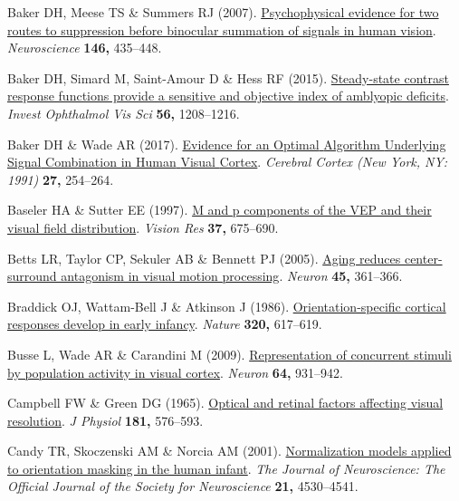\documentclass[
  letterpaper,
  DIV=11,
  numbers=noendperiod]{scrartcl}
\newlength{\cslhangindent}
\newenvironment{CSLReferences}[2] %
 {\begin{list}{}{%
  \setlength{\itemindent}{0pt}
  \setlength{\leftmargin}{0pt}
  \setlength{\parsep}{0pt}
  \ifodd #1
   \setlength{\leftmargin}{\cslhangindent}
   \setlength{\itemindent}{-1\cslhangindent}
  \fi
  \setlength{\itemsep}{#2\baselineskip}}}
 {\end{list}}
\begin{document}
\begin{CSLReferences}{1}{1}
Baker DH, Meese TS \& Summers RJ (2007).
\href{https://doi.org/10.1016/j.neuroscience.2007.01.030}{Psychophysical
evidence for two routes to suppression before binocular summation of
signals in human vision}. \emph{Neuroscience} \textbf{146,} 435--448.

Baker DH, Simard M, Saint-Amour D \& Hess RF (2015).
\href{https://doi.org/10.1167/iovs.14-15611}{Steady-state contrast
response functions provide a sensitive and objective index of amblyopic
deficits}. \emph{Invest Ophthalmol Vis Sci} \textbf{56,} 1208--1216.

Baker DH \& Wade AR (2017).
\href{https://doi.org/10.1093/cercor/bhw395}{Evidence for an {Optimal}
{Algorithm} {Underlying} {Signal} {Combination} in {Human} {Visual}
{Cortex}}. \emph{Cerebral Cortex (New York, NY: 1991)} \textbf{27,}
254--264.

Baseler HA \& Sutter EE (1997).
\href{https://doi.org/10.1016/s0042-6989(96)00209-x}{M and p components
of the VEP and their visual field distribution}. \emph{Vision Res}
\textbf{37,} 675--690.

Betts LR, Taylor CP, Sekuler AB \& Bennett PJ (2005).
\href{https://doi.org/10.1016/j.neuron.2004.12.041}{Aging reduces
center-surround antagonism in visual motion processing}. \emph{Neuron}
\textbf{45,} 361--366.

Braddick OJ, Wattam-Bell J \& Atkinson J (1986).
\href{https://doi.org/10.1038/320617a0}{Orientation-specific cortical
responses develop in early infancy}. \emph{Nature} \textbf{320,}
617--619.

Busse L, Wade AR \& Carandini M (2009).
\href{https://doi.org/10.1016/j.neuron.2009.11.004}{Representation of
concurrent stimuli by population activity in visual cortex}.
\emph{Neuron} \textbf{64,} 931--942.

Campbell FW \& Green DG (1965).
\href{https://doi.org/10.1113/jphysiol.1965.sp007784}{Optical and
retinal factors affecting visual resolution}. \emph{J Physiol}
\textbf{181,} 576--593.

Candy TR, Skoczenski AM \& Norcia AM (2001).
\href{https://doi.org/10.1523/JNEUROSCI.21-12-04530.2001}{Normalization
models applied to orientation masking in the human infant}. \emph{The
Journal of Neuroscience: The Official Journal of the Society for
Neuroscience} \textbf{21,} 4530--4541.


\end{CSLReferences}
\end{document}
